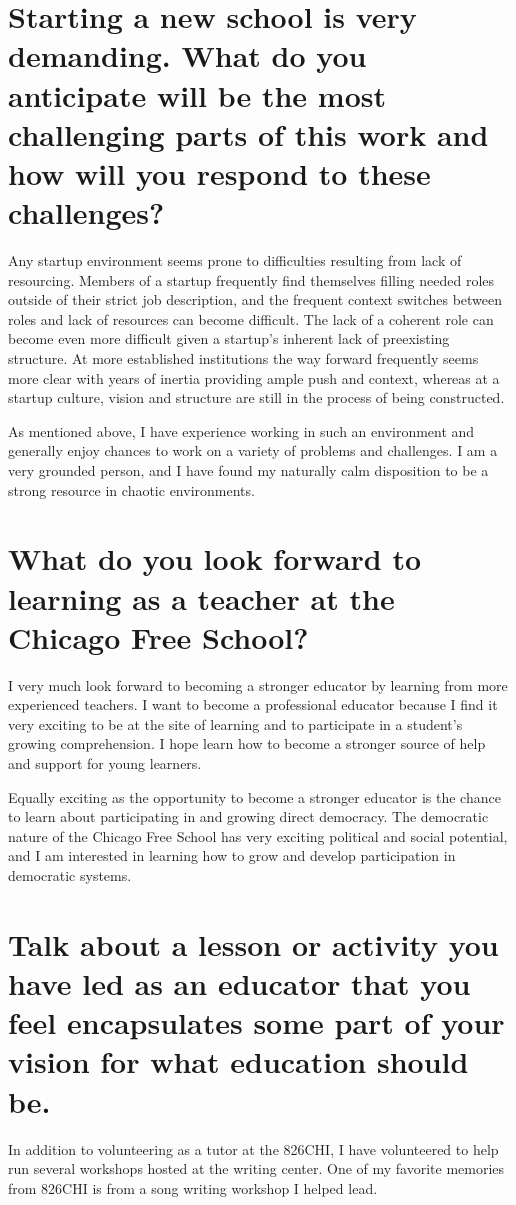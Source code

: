\documentclass[oneside]{memoir}
\begin{document}
\section*{Starting a new school is very demanding.  What do you
  anticipate will be the most challenging parts of this work and how
  will you respond to these challenges?}
Any startup environment seems prone to difficulties resulting from
lack of resourcing.
Members of a startup frequently find themselves filling needed roles
outside of their strict job description, and the frequent context
switches between roles and lack of resources can become difficult.
The lack of a coherent role can become even more difficult 
given a startup's inherent lack of preexisting structure.
At more established institutions the way forward frequently seems
more clear with years of inertia providing ample push and context,
whereas at a startup culture, vision and structure are still in the
process of being constructed.

As mentioned above, I have experience working in such an environment
and generally enjoy chances to work on a variety of problems and
challenges. 
I am a very grounded person, and I have found my naturally calm
disposition to be a strong resource in chaotic environments.

\section*{What do you look forward to learning as a teacher at the
  Chicago Free School?}
I very much look forward to becoming a stronger educator by learning
from more experienced teachers.
I want to become a professional educator because I find it
very exciting to be at the site of learning and to participate in a
student's growing comprehension.
I hope learn how to become a stronger source of help and support for
young learners.

Equally exciting as the opportunity to become a stronger educator is
the chance to learn about participating in and growing direct
democracy.
The democratic nature of the Chicago Free School has very exciting
political and social potential, and I am interested in learning how to
grow and develop participation in democratic systems.

\section*{Talk about a lesson or activity you have led as an educator
  that you feel encapsulates some part of your vision for what
  education should be.}
In addition to volunteering as a tutor at the 826CHI, I have
volunteered to help run several workshops hosted at the writing
center.
One of my favorite memories from 826CHI is from a song writing
workshop I helped lead.
\end{document}

